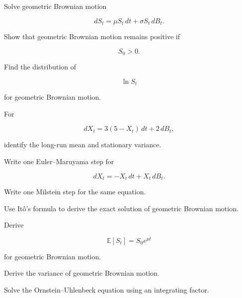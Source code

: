 \begin{exercise}[2]
Solve geometric Brownian motion

\[
dS_t
=
\mu S_t\,dt
+
\sigma S_t\,dB_t.
\]
\end{exercise}

\begin{exercise}[2]
Show that geometric Brownian motion remains positive if

\[
S_0>0.
\]
\end{exercise}

\begin{exercise}[2]
Find the distribution of

\[
\ln S_t
\]

for geometric Brownian motion.
\end{exercise}

\begin{exercise}[2]
For

\[
dX_t
=
3(5-X_t)\,dt
+
2\,dB_t,
\]

identify the long-run mean and stationary variance.
\end{exercise}

\begin{exercise}[2]
Write one Euler--Maruyama step for

\[
dX_t
=
-X_t\,dt
+
X_t\,dB_t.
\]
\end{exercise}

\begin{exercise}[2]
Write one Milstein step for the same equation.
\end{exercise}

\begin{exercise}[3]
Use It\^o's formula to derive the exact solution of geometric Brownian
motion.
\end{exercise}

\begin{exercise}[3]
Derive

\[
\mathbb{E}[S_t]
=
S_0e^{\mu t}
\]

for geometric Brownian motion.
\end{exercise}

\begin{exercise}[3]
Derive the variance of geometric Brownian motion.
\end{exercise}

\begin{exercise}[3]
Solve the Ornstein--Uhlenbeck equation using an integrating factor.
\end{exercise}

